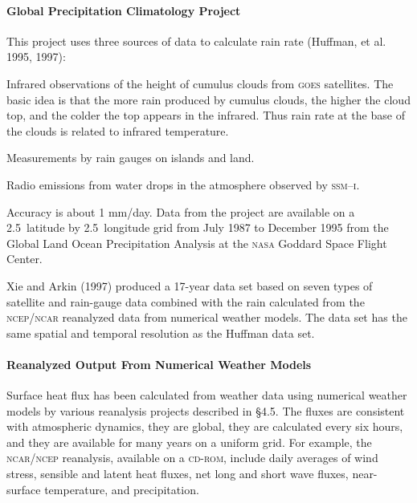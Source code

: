 \paragraph{Global Precipitation Climatology Project} This project uses three sources
of data to calculate
rain rate (Huffman, et al. 1995, 1997):
\begin{enumerate}
\vitem
Infrared observations of the height of cumulus clouds from
\textsc{goes} satellites. The basic idea is that the more rain
produced by cumulus clouds, the higher the cloud top, and the colder
the top appears in the infrared. Thus rain rate at the base of the
clouds is related to infrared temperature.

\vitem
Measurements by rain gauges on islands and land.

\vitem
Radio emissions from water drops in the atmosphere observed by
\textsc{ssm--i}.
\end{enumerate}
Accuracy is about 1 mm/day. Data from the
project are available on a 2.5\degrees\ latitude by
2.5\degrees\ longitude grid from July 1987 to December 1995 from the
Global Land Ocean Precipitation Analysis at the \textsc{nasa} Goddard
Space Flight Center.

Xie and Arkin (1997) produced a 17-year data set based on seven types
of satellite and rain-gauge data combined with the rain calculated
from the \textsc{ncep/ncar} reanalyzed data from numerical weather
models. The data set has the same spatial and temporal resolution as
the Huffman data set.

\paragraph{Reanalyzed Output From Numerical Weather Models}
Surface heat flux has
been calculated from weather data using numerical weather models by
various reanalysis projects described in \S 4.5. The fluxes are
consistent with atmospheric dynamics, they are global, they are
calculated every six hours, and they are available for many years on a
uniform grid. For example, the \textsc{ncar/ncep} reanalysis,
available on a \textsc{cd-rom}, include daily averages of wind
stress, sensible and latent heat
fluxes, net long and short wave fluxes, near-surface temperature, and
precipitation.

